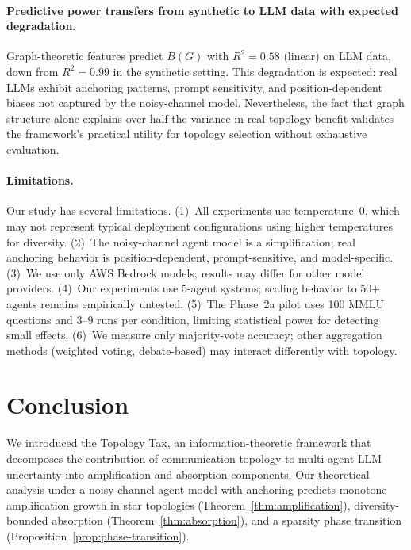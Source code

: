 \documentclass{article}
\begin{document}
\paragraph{Predictive power transfers from synthetic to LLM data with expected degradation.}
Graph-theoretic features predict $B(G)$ with $R^2 = 0.58$ (linear) on LLM data, down from $R^2 = 0.99$ in the synthetic setting. This degradation is expected: real LLMs exhibit anchoring patterns, prompt sensitivity, and position-dependent biases not captured by the noisy-channel model. Nevertheless, the fact that graph structure alone explains over half the variance in real topology benefit validates the framework's practical utility for topology selection without exhaustive evaluation.

\paragraph{Limitations.}
Our study has several limitations. (1)~All experiments use temperature~0, which may not represent typical deployment configurations using higher temperatures for diversity. (2)~The noisy-channel agent model is a simplification; real anchoring behavior is position-dependent, prompt-sensitive, and model-specific. (3)~We use only AWS Bedrock models; results may differ for other model providers. (4)~Our experiments use 5-agent systems; scaling behavior to 50+ agents remains empirically untested. (5)~The Phase~2a pilot uses 100 MMLU questions and 3--9 runs per condition, limiting statistical power for detecting small effects. (6)~We measure only majority-vote accuracy; other aggregation methods (weighted voting, debate-based) may interact differently with topology.

\section{Conclusion}
\label{sec:conclusion}

We introduced the Topology Tax, an information-theoretic framework that decomposes the contribution of communication topology to multi-agent LLM uncertainty into amplification and absorption components. Our theoretical analysis under a noisy-channel agent model with anchoring predicts monotone amplification growth in star topologies (Theorem~\ref{thm:amplification}), diversity-bounded absorption (Theorem~\ref{thm:absorption}), and a sparsity phase transition (Proposition~\ref{prop:phase-transition}).
\end{document}

